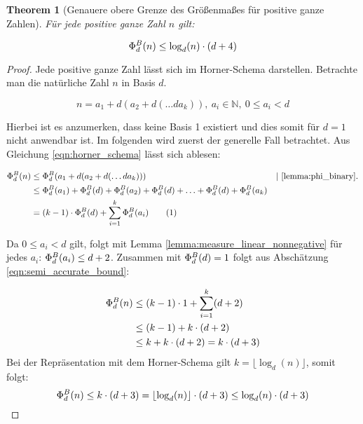 \documentclass{article}
\newtheorem{theorem}{Theorem}[section]
\theoremstyle{nonumberplain}
\newtheorem{proof}{Beweis}
\newcommand{\sidenote}[1]{&&|\ \text{#1}.}
\newcommand\numberthis{\addtocounter{equation}{1}\tag{\theequation}}
\begin{document}
\begin{theorem}[Genauere obere Grenze des Größenmaßes für positive ganze Zahlen]\label{theorem:accurate_bound}
    Für jede positive ganze Zahl \(n\) gilt:
    
        \[\Phi_{d}^{B}(n) \leq \log_d(n) \cdot (d+4)\]
\end{theorem}
\begin{proof}
    Jede positive ganze Zahl lässt sich im Horner-Schema darstellen.
    Betrachte man die natürliche Zahl \(n\) in Basis \(d\).

        \begin{equation}\label{eqn:horner_schema}
            n = a_1 + d (a_2 + d (\ldots d a_k)),\ a_i\in\mathbb{N},\ 0 \leq a_i < d
        \end{equation}

    Hierbei ist es anzumerken, dass keine Basis 1 existiert und dies somit für \(d=1\) nicht anwendbar ist.
    Im folgenden wird zuerst der generelle Fall betrachtet.
    Aus Gleichung \ref{eqn:horner_schema} lässt sich ablesen:

    \begin{align*}
        \measure{n} 
        &\leq \measure{a_1 + d (a_2 + d (\ldots d a_k))} \sidenote{\ref{lemma:phi_binary}} \\
        &\leq \measure{a_1} + \measure{d} + \measure{a_2} + \measure{d} + \ldots + \measure{d} + \measure{a_k} \\
        &= (k-1)\cdot\measure{d} + \sum_{i=1}^k \measure{a_i} \numberthis\label{eqn:semi_accurate_bound}
    \end{align*}
    
    Da \(0 \leq a_i < d\) gilt, folgt mit Lemma \ref{lemma:measure_linear_nonnegative} für jedes \(a_i\): \(\Phi_{d}^{B}(a_i) \leq d + 2\).
    Zusammen mit \(\Phi_{d}^{B}(d) = 1\) folgt aus Abschätzung \ref{eqn:semi_accurate_bound}:
    
    \begin{align*}
        \Phi_{d}^{B}(n) 
        &\leq (k-1) \cdot 1 + \sum_{i=1}^k (d+2) \\
        &\leq (k-1) + k \cdot (d+2) \\
        &\leq k + k \cdot (d+2) = k \cdot (d+3) \\
    \end{align*}
Bei der Repräsentation mit dem Horner-Schema gilt \(k = \lfloor \log_d(n) \rfloor\), somit folgt:
        \[\Phi_{d}^{B}(n) \leq k \cdot (d+3) = \lfloor \log_d(n) \rfloor \cdot (d+3) \leq \log_d(n) \cdot (d+3)\]


\end{proof}
\end{document}

